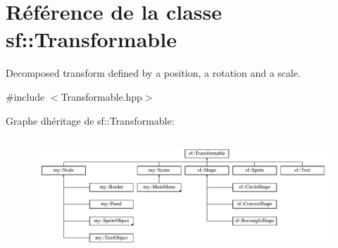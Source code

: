 \hypertarget{classsf_1_1Transformable}{}\section{Référence de la classe sf\+:\+:Transformable}
\label{classsf_1_1Transformable}


Decomposed transform defined by a position, a rotation and a scale.  




{\ttfamily \#include $<$Transformable.\+hpp$>$}

Graphe d\textquotesingle{}héritage de sf\+:\+:Transformable\+:\begin{figure}[H]
\begin{center}
\leavevmode
\includegraphics[height=4.375000cm]{classsf_1_1Transformable}
\end{center}
\end{figure}
